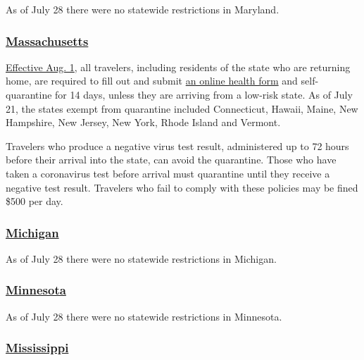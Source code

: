 As of July 28 there were no statewide restrictions in Maryland.

\hypertarget{massachusetts}{%
\subsubsection{\texorpdfstring{\href{https://www.mass.gov/info-details/covid-19-updates-and-information}{Massachusetts}}{Massachusetts}}\label{massachusetts}}

\href{https://www.mass.gov/info-details/covid-19-travel-order}{Effective
Aug. 1}, all travelers, including residents of the state who are
returning home, are required to fill out and submit
\href{https://www.mass.gov/forms/massachusetts-travel-form}{an online
health form} and self-quarantine for 14 days, unless they are arriving
from a low-risk state. As of July 21, the states exempt from quarantine
included Connecticut, Hawaii, Maine, New Hampshire, New Jersey, New
York, Rhode Island and Vermont.

Travelers who produce a negative virus test result, administered up to
72 hours before their arrival into the state, can avoid the quarantine.
Those who have taken a coronavirus test before arrival must quarantine
until they receive a negative test result. Travelers who fail to comply
with these policies may be fined \$500 per day.

\hypertarget{michigan}{%
\subsubsection{\texorpdfstring{\href{https://www.michigan.gov/coronavirus/}{Michigan}}{Michigan}}\label{michigan}}

As of July 28 there were no statewide restrictions in Michigan.

\hypertarget{minnesota}{%
\subsubsection{\texorpdfstring{\href{https://www.exploreminnesota.com/info/coronavirus-covid-19-information}{Minnesota}}{Minnesota}}\label{minnesota}}

As of July 28 there were no statewide restrictions in Minnesota.

\hypertarget{mississippi}{%
\subsubsection{\texorpdfstring{\href{https://visitmississippi.org/covid-19-travel-alert/}{Mississippi}}{Mississippi}}\label{mississippi}}

